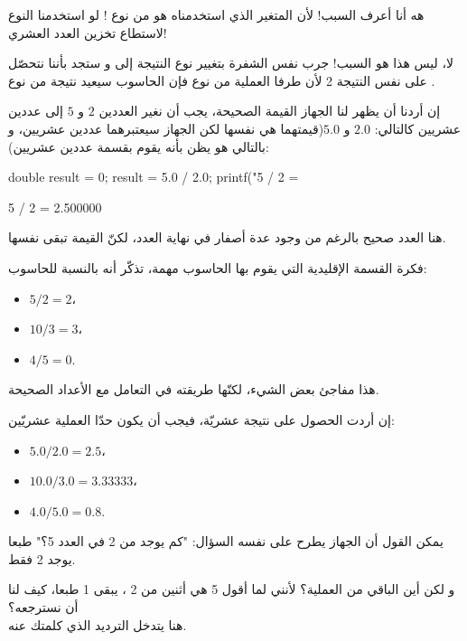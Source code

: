 \begin{question}
  هه أنا أعرف السبب! لأن المتغير
  الذي استخدمناه هو من نوع
  !
  لو استخدمنا النوع
  لاستطاع تخزين العدد العشري!
\end{question}

لا، ليس هذا هو السبب! جرب  نفس الشفرة بتغيير نوع النتيجة إلى
و ستجد بأننا نتحصّل على نفس النتيجة 2 لأن طرفا العملية من نوع
فإن الحاسوب سيعيد نتيجة من نوع
.

إن أردنا أن يظهر لنا الجهاز القيمة الصحيحة، يجب أن نغير العددين $ 2 $ و $ 5 $ إلى عددين عشريين كالتالي: $ 2.0 $ و $ 5.0  $(قيمتهما هي نفسها لكن الجهاز سيعتبرهما عددين عشريين، و بالتالي هو يظن بأنه يقوم بقسمة عددين عشريين):

\begin{Csource}
  double result = 0;
  result = 5.0 / 2.0;
  printf("5 / 2 =  %
\end{Csource}

\begin{Console}
  5 / 2 = 2.500000
\end{Console}

هنا العدد صحيح بالرغم من وجود عدة أصفار في نهاية العدد، لكنّ القيمة تبقى نفسها.

فكرة القسمة الإقليدية التي يقوم بها الحاسوب مهمة، تذكّر أنه بالنسبة للحاسوب:

\begin{itemize}
  \item $ 5 / 2 = 2 $،
  \item $ 10 / 3 = 3 $،
  \item $ 4 / 5 = 0 $.
\end{itemize}

هذا مفاجئ بعض الشيء، لكنّها طريقته في التعامل مع الأعداد الصحيحة.

إن أردت الحصول على نتيجة عشريّة، فيجب أن يكون حدّا العملية عشريّين:

\begin{itemize}
  \item $ 5.0 / 2.0 = 2.5 $،
  \item $ 10.0 / 3.0 = 3.33333 $،
  \item $ 4.0 / 5.0 = 0.8 $.
\end{itemize}

يمكن القول أن الجهاز يطرح على نفسه السؤال: "كم يوجد من 2 في العدد 5؟" طبعا يوجد 2 فقط.

و لكن أين الباقي من العملية؟ لأنني لما أقول 5 هي أثنين من 2 ، يبقى 1 طبعا، كيف لنا أن نسترجعه؟\\
هنا يتدخل الترديد الذي كلمتك عنه.

